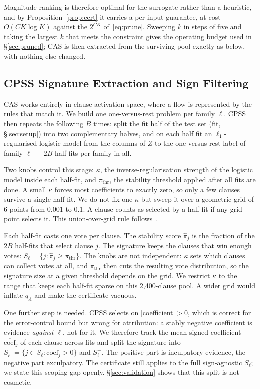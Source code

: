 \documentclass[conference]{IEEEtran}
\begin{document}
Magnitude ranking is therefore optimal for the surrogate rather than a
heuristic, and by Proposition~\ref{prop:cert} it carries a per-input
guarantee, at cost $O(CK\log K)$ against the $2^{CK}$ of~\eqref{eq:prune}. Sweeping
$k$ in steps of five and taking the largest $k$ that meets the constraint
gives the operating budget used in \S\ref{sec:pruned}; CAS is then
extracted from the surviving pool exactly as below, with nothing else
changed.

\subsection{CPSS Signature Extraction and Sign Filtering}
\label{sec:cpss}
CAS works entirely
in clause-activation space, where a flow is represented by the rules that
match it. We build one one-versus-rest problem
per family $\ell$. CPSS then repeats the following $B$ times: split the
fit half of the test set ($\mathrm{fit}$, \S\ref{sec:setup})
into two complementary halves, and on
each half fit an $\ell_1$-regularised logistic model from the columns of
$Z$ to the one-versus-rest label of family $\ell$ --- $2B$ half-fits per
family in all.

Two knobs control this stage: $\kappa$, the
inverse-regularisation strength of the logistic model inside each
half-fit, and $\pi_{\mathrm{thr}}$, the stability threshold applied after
all fits are done. A small $\kappa$ forces most coefficients to exactly
zero, so only a few clauses survive a single half-fit. We do not fix one
$\kappa$ but sweep it over a geometric
grid of 6 points from 0.001 to 0.1. A clause counts as selected by a
half-fit if any grid point selects it. This union-over-grid rule
follows~\cite{shah2013}.

Each half-fit casts one vote per clause. The stability score
$\hat{\pi}_j$ is the fraction of the $2B$ half-fits that select clause $j$.
The signature keeps the clauses that win enough votes:
$S_\ell = \{j : \hat{\pi}_j \ge \pi_{\mathrm{thr}}\}$. The knobs are not
independent: $\kappa$ sets which clauses can collect votes at all, and
$\pi_{\mathrm{thr}}$ then cuts the resulting vote distribution, so the
signature size at a given threshold depends on the grid. We restrict
$\kappa$ to the range that keeps each half-fit sparse on this
2{,}400-clause pool. A wider grid would inflate $q_\Lambda$ and make the
certificate vacuous.

One further step is needed. CPSS selects on $|$coefficient$|>0$, which is
correct for the error-control bound but wrong for attribution: a stably
negative coefficient is evidence \emph{against} $\ell$, not for it. We
therefore track the mean signed coefficient
$\overline{\mathrm{coef}}_j$ of each clause across fits and split the
signature into
$S_\ell^{+} = \{j \in S_\ell : \overline{\mathrm{coef}}_j > 0\}$
and $S_\ell^{-}$. The positive part is inculpatory evidence, the negative
part exculpatory. The certificate still applies to the full
sign-agnostic $S_\ell$; we state this scoping gap openly.
\S\ref{sec:validation} shows that this split is not cosmetic.
\end{document}
